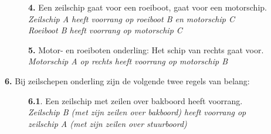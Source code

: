 \vspace{-0.7cm}
\begin{figure}[H]
	\centering
	\begin{minipage}[t]{0.70\textwidth}
		\textbf{4.} Een zeilschip gaat voor een roeiboot, gaat voor een motorschip.\\
		\textit{Zeilschip A heeft voorrang op roeiboot B en motorschip C\\
			Roeiboot B heeft voorrang op motorschip C}
	\end{minipage}
	\hfill
	\begin{minipage}[t]{0.20\textwidth}
		\label{pic:kr4}
	\end{minipage}
	\hfill
\end{figure}

\vspace{-0.7cm}
\begin{figure}[H]
	\centering
	\begin{minipage}[t]{0.70\textwidth}
		\textbf{5.} Motor- en roeiboten onderling: Het schip van rechts gaat voor.\\
		\textit{Motorschip A op rechts heeft voorrang op motorschip B}
	\end{minipage}
	\hfill
	\begin{minipage}[t]{0.20\textwidth}
		\label{pic:kr5}
	\end{minipage}
	\hfill
\end{figure}

\vspace{-0.7cm}

\textbf{6.} Bij zeilschepen onderling zijn de volgende twee regels van belang:
\vspace{-0.5cm}
\begin{figure}[H]
	\centering
	\hspace{0.02\textwidth}
	\begin{minipage}[t]{0.70\textwidth}
		\textbf{6.1}. Een zeilschip met zeilen over bakboord heeft voorrang.\\
		\textit{Zeilschip B (met zijn zeilen over bakboord) heeft voorrang op \\zeilschip A (met zijn zeilen over stuurboord)}
	\end{minipage}
	\hfill
	\begin{minipage}[t]{0.20\textwidth}
		\label{pic:kr41}
	\end{minipage}
	\hfill
\end{figure}

